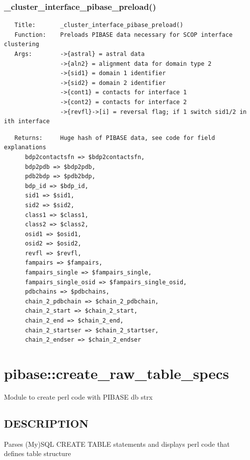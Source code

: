 \documentclass{article}
\begin{document}
\subsubsection*{\_cluster\_interface\_pibase\_preload()\label{pibase::calc::interfaces__cluster_interface_pibase_preload_}}
\begin{verbatim}
   Title:       _cluster_interface_pibase_preload()
   Function:    Preloads PIBASE data necessary for SCOP interface clustering
   Args:        ->{astral} = astral data
                ->{aln2} = alignment data for domain type 2
                ->{sid1} = domain 1 identifier
                ->{sid2} = domain 2 identifier
                ->{cont1} = contacts for interface 1
                ->{cont2} = contacts for interface 2
                ->{revfl}->[i] = reversal flag; if 1 switch sid1/2 in ith interface
\end{verbatim}
\begin{verbatim}
   Returns:     Huge hash of PIBASE data, see code for field explanations
      bdp2contactsfn => $bdp2contactsfn,
      bdp2pdb => $bdp2pdb,
      pdb2bdp => $pdb2bdp,
      bdp_id => $bdp_id,
      sid1 => $sid1,
      sid2 => $sid2,
      class1 => $class1,
      class2 => $class2,
      osid1 => $osid1,
      osid2 => $osid2,
      revfl => $revfl,
      fampairs => $fampairs,
      fampairs_single => $fampairs_single,
      fampairs_single_osid => $fampairs_single_osid,
      pdbchains => $pdbchains,
      chain_2_pdbchain => $chain_2_pdbchain,
      chain_2_start => $chain_2_start,
      chain_2_end => $chain_2_end,
      chain_2_startser => $chain_2_startser,
      chain_2_endser => $chain_2_endser
\end{verbatim}
\clearpage
\section{pibase::create\_raw\_table\_specs\label{pibase::create_raw_table_specs}}


Module to create perl code with PIBASE db strx

\subsection*{DESCRIPTION\label{pibase::create_raw_table_specs_DESCRIPTION}}


Parses (My)SQL CREATE TABLE statements and displays perl code that defines table structure
\end{document}
